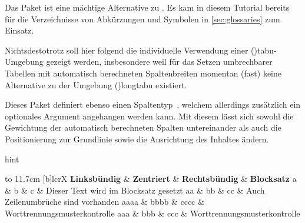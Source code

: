 \documentclass[%
  english,ngerman,%
  cdgeometry=no,DIV=12,%
  cd=false,cdfont=false,cdtitle=true,%
  headings=normal,%
  automark,%
  listof=toc,%
]{tudscrartcl}
\makeatletter
\newcommand*\pcolumnfuzz[1]{\pretocmd\@endpbox{\hfuzz=#1}{}{}}
\makeatother
\begin{document}
Das Paket  ist eine mächtige Alternative zu . 
Es kam in diesem Tutorial bereits für die Verzeichnisse von Abkürzungen und 
Symbolen in \autoref{sec:glossaries} zum Einsatz. 


Nichtsdestotrotz soll hier folgend die individuelle Verwendung einer 
\Environment(){tabu}-Umgebung gezeigt werden, insbesondere weil 
für das Setzen umbrechbarer Tabellen mit automatisch berechneten Spaltenbreiten 
momentan (fast) keine Alternative zu der Umgebung 
\Environment(){longtabu} existiert. 

Dieses Paket definiert ebenso einen Spaltentyp~, welchem allerdings 
zusätzlich ein optionales Argument angehangen werden kann. Mit diesem lässt 
sich sowohl die Gewichtung der automatisch berechneten Spalten untereinander 
als auch die Positionierung zur Grundlinie sowie die Ausrichtung des Inhaltes 
ändern.
%
\begingroup
\pcolumnfuzz{70pt}
\begin{Code}[input]{hint}
\begin{tabu} to 11.7cm [b]{lcrX}
\toprule
\textbf{Linksbündig} & \textbf{Zentriert} & 
\textbf{Rechtsbündig} & \textbf{Blocksatz} \tabularnewline\midrule
a    & b    & c    & Dieser Text wird im Blocksatz gesetzt\tabularnewline
aa   & bb   & cc   & Auch Zeilenumbrüche sind vorhanden\tabularnewline
aaaa & bbbb & cccc & Worttrennungsmus\-terkontrolle\tabularnewline
aaa  & bbb  & ccc  & Worttrennungsmusterkontrolle
\tabularnewline\bottomrule
\end{tabu}
\end{Code}
\endgroup
\end{document}
